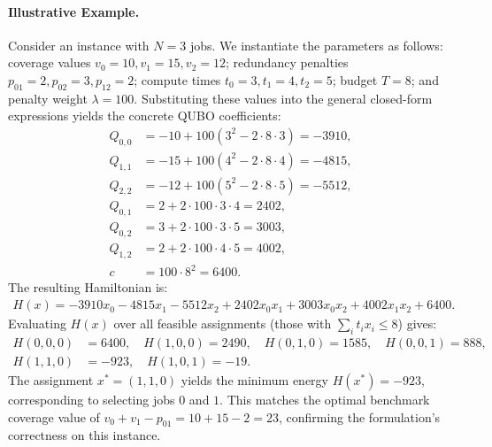 \documentclass[12pt]{article}
\begin{document}
\paragraph{Illustrative Example.}
Consider an instance with $N=3$ jobs. We instantiate the parameters as follows: coverage values $v_0=10, v_1=15, v_2=12$; redundancy penalties $p_{01}=2, p_{02}=3, p_{12}=2$; compute times $t_0=3, t_1=4, t_2=5$; budget $T=8$; and penalty weight $\lambda=100$. Substituting these values into the general closed-form expressions yields the concrete QUBO coefficients:
\begin{align}
    Q_{0,0} &= -10 + 100(3^2 - 2\cdot8\cdot3) = -3910, \\
    Q_{1,1} &= -15 + 100(4^2 - 2\cdot8\cdot4) = -4815, \\
    Q_{2,2} &= -12 + 100(5^2 - 2\cdot8\cdot5) = -5512, \\
    Q_{0,1} &= 2 + 2\cdot100\cdot3\cdot4 = 2402, \\
    Q_{0,2} &= 3 + 2\cdot100\cdot3\cdot5 = 3003, \\
    Q_{1,2} &= 2 + 2\cdot100\cdot4\cdot5 = 4002, \\
    c &= 100 \cdot 8^2 = 6400.
\end{align}
The resulting Hamiltonian is:
\begin{align}
    H(x) = -3910 x_0 - 4815 x_1 - 5512 x_2 + 2402 x_0 x_1 + 3003 x_0 x_2 + 4002 x_1 x_2 + 6400.
\end{align}
Evaluating $H(x)$ over all feasible assignments (those with $\sum_i t_i x_i \leq 8$) gives:
\begin{align}
    H(0,0,0) &= 6400, \quad H(1,0,0) = 2490, \quad H(0,1,0) = 1585, \quad H(0,0,1) = 888, \\
    H(1,1,0) &= -923, \quad H(1,0,1) = -19.
\end{align}
The assignment $x^* = (1,1,0)$ yields the minimum energy $H(x^*) = -923$, corresponding to selecting jobs $0$ and $1$. This matches the optimal benchmark coverage value of $v_0 + v_1 - p_{01} = 10 + 15 - 2 = 23$, confirming the formulation's correctness on this instance.
\end{document}
